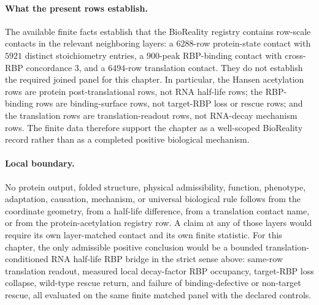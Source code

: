 \paragraph{What the present rows establish.}
The available finite facts establish that the BioReality registry contains row-scale contacts in the relevant neighboring layers: a $6288$-row protein-state contact with $5921$ distinct stoichiometry entries, a $900$-peak RBP-binding contact with cross-RBP concordance $3$, and a $6494$-row translation contact.  They do not establish the required joined panel for this chapter.  In particular, the Hansen acetylation rows are protein post-translational rows, not RNA half-life rows; the RBP-binding rows are binding-surface rows, not target-RBP loss or rescue rows; and the translation rows are translation-readout rows, not RNA-decay mechanism rows.  The finite data therefore support the chapter as a well-scoped BioReality record rather than as a completed positive biological mechanism.

\paragraph{Local boundary.}
No protein output, folded structure, physical admissibility, function, phenotype, adaptation, causation, mechanism, or universal biological rule follows from the coordinate geometry, from a half-life difference, from a translation contact name, or from the protein-acetylation registry row.  A claim at any of those layers would require its own layer-matched contact and its own finite statistic.  For this chapter, the only admissible positive conclusion would be a bounded translation-conditioned RNA half-life RBP bridge in the strict sense above: same-row translation readout, measured local decay-factor RBP occupancy, target-RBP loss collapse, wild-type rescue return, and failure of binding-defective or non-target rescue, all evaluated on the same finite matched panel with the declared controls.